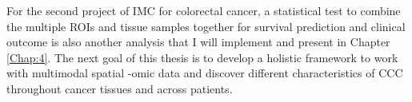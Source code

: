 For the second project of IMC for colorectal cancer, a statistical test to combine the multiple ROIs and tissue samples together for survival prediction and clinical outcome is also another analysis that I will implement and present in Chapter \ref{Chap:4}. The next goal of this thesis is to develop a holistic framework to work with multimodal spatial -omic data and discover different characteristics of CCC throughout cancer tissues and across patients. 



